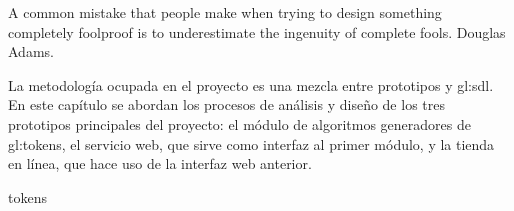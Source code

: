 %
%

{
  \epigrafe
  {%
    A common mistake that people make when trying to design something completely
    foolproof is to underestimate the ingenuity of complete fools.%
  }
  {%
     Douglas Adams.%
  }
}

\noindent
La metodología ocupada en el proyecto es una mezcla entre prototipos y
\gls{gl:sdl}. En este capítulo se abordan los procesos de análisis y
diseño de los tres prototipos principales del proyecto: el módulo de
algoritmos generadores de \glspl{gl:token}, el servicio web, que sirve
como interfaz al primer módulo, y la tienda en línea, que hace uso de
la interfaz web anterior.

{tokens}
